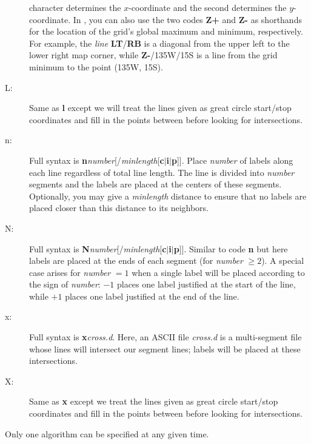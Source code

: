 \begin{description}
character determines the $x$-coordinate and the second determines the $y$-coordinate.  In ,
you can also use the two codes {\bf Z+} and {\bf Z-} as shorthands for the location of the grid's global
maximum and minimum, respectively.  For example, the {\it line} {\bf LT}/{\bf RB} is a diagonal from the
upper left to the lower right map corner, while {\bf Z-}/135W/15S is a line from the grid minimum to the point
(135\DS W, 15\DS S).
\item [L:] Same as {\bf l} except we will treat the lines given as great circle start/stop coordinates and fill in
the points between before looking for intersections.
\item [n:] Full syntax is {\bf n}{\it number}[/{\it minlength}[{\bf c$|$i$|$p}]].  Place
{\it number} of labels along each line regardless of total line length.  The line is divided into {\it number}
segments and the labels are placed at the centers of these segments.  Optionally, you may give a {\it minlength}
distance to ensure that no labels are placed closer than this distance to its neighbors.
\item [N:] Full syntax is {\bf N}{\it number}[/{\it minlength}[{\bf c$|$i$|$p}]].  Similar to
code {\bf n} but here labels are placed at the ends of each segment (for {\it number} $\geq 2$).  A special
case arises for {\it number} $= 1$ when a single label will be placed according to the sign of {\it number}:
$-1$ places one label justified at the start of the line, while $+1$ places one label justified at the end of the line.
\item [x:] Full syntax is {\bf x}{\it cross.d}.  Here, an ASCII file {\it cross.d} is
a multi-segment file whose lines will intersect our segment lines; labels will be placed at these intersections.
\item [X:] Same as {\bf x} except we treat the lines given as great circle start/stop coordinates and fill in the
points between before looking for intersections.
\end{description}
Only one algorithm can be specified at any given time.


